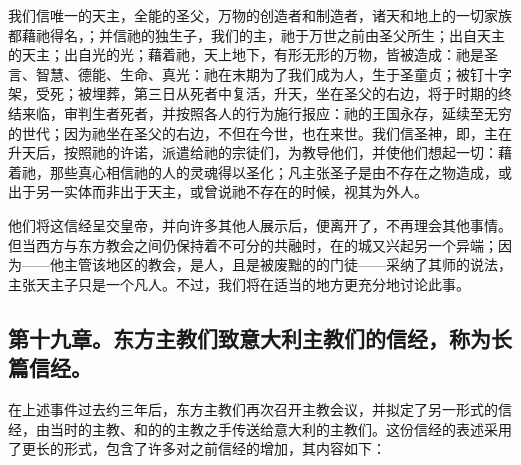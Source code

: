 \par

我们信唯一的天主，全能的圣父，万物的创造者和制造者，诸天和地上的一切家族都藉祂得名，；并信祂的独生子，我们的主，祂于万世之前由圣父所生；出自天主的天主；出自光的光；藉着祂，天上地下，有形无形的万物，皆被造成：祂是圣言、智慧、德能、生命、真光：祂在末期为了我们成为人，生于圣童贞；被钉十字架，受死；被埋葬，第三日从死者中复活，升天，坐在圣父的右边，将于时期的终结来临，审判生者死者，并按照各人的行为施行报应：祂的王国永存，延续至无穷的世代；因为祂坐在圣父的右边，不但在今世，也在来世。我们信圣神，即，主在升天后，按照祂的许诺，派遣给祂的宗徒们，为教导他们，并使他们想起一切：藉着祂，那些真心相信祂的人的灵魂得以圣化；凡主张圣子是由不存在之物造成，或出于另一实体而非出于天主，或曾说祂不存在的时候，视其为外人。\par

他们将这信经呈交皇帝，并向许多其他人展示后，便离开了，不再理会其他事情。但当西方与东方教会之间仍保持着不可分的共融时，在的城又兴起另一个异端；因为——他主管该地区的教会，是人，且是被废黜的的门徒——采纳了其师的说法，主张天主子只是一个凡人。不过，我们将在适当的地方更充分地讨论此事。\par


\subsection{第十九章。东方主教们致意大利主教们的信经，称为长篇信经。}

在上述事件过去约三年后，东方主教们再次召开主教会议，并拟定了另一形式的信经，由当时的主教、和的的主教之手传送给意大利的主教们。这份信经的表述采用了更长的形式，包含了许多对之前信经的增加，其内容如下：\par

